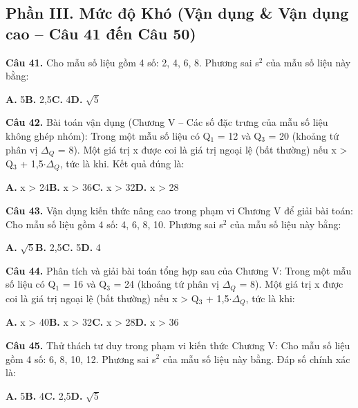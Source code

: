 \documentclass[11pt,a4paper]{article}
\begin{document}
\subsection*{\color{accent} Phần III. Mức độ Khó (Vận dụng \& Vận dụng cao -- Câu 41 đến Câu 50)}
\textbf{\color{primary} Câu 41.} Cho mẫu số liệu gồm 4 số: 2, 4, 6, 8. Phương sai s$^2$ của mẫu số liệu này bằng:\par
\hspace*{1.5em}\textbf{A.} 5\quad\quad \textbf{B.} 2,5\quad\quad \textbf{C.} 4\quad\quad \textbf{D.} $\sqrt{5}$\par\vspace{2pt}
\textbf{\color{primary} Câu 42.} Bài toán vận dụng (Chương V – Các số đặc trưng của mẫu số liệu không ghép nhóm): Trong một mẫu số liệu có Q$_1$ = 12 và Q$_3$ = 20 (khoảng tứ phân vị $\Delta_Q$ = 8). Một giá trị x được coi là giá trị ngoại lệ (bất thường) nếu x > Q$_3$ + 1,5$\cdot$$\Delta_Q$, tức là khi. Kết quả đúng là:\par
\hspace*{1.5em}\textbf{A.} x > 24\quad\quad \textbf{B.} x > 36\quad\quad \textbf{C.} x > 32\quad\quad \textbf{D.} x > 28\par\vspace{2pt}
\textbf{\color{primary} Câu 43.} Vận dụng kiến thức nâng cao trong phạm vi Chương V để giải bài toán: Cho mẫu số liệu gồm 4 số: 4, 6, 8, 10. Phương sai s$^2$ của mẫu số liệu này bằng:\par
\hspace*{1.5em}\textbf{A.} $\sqrt{5}$\quad\quad \textbf{B.} 2,5\quad\quad \textbf{C.} 5\quad\quad \textbf{D.} 4\par\vspace{2pt}
\textbf{\color{primary} Câu 44.} Phân tích và giải bài toán tổng hợp sau của Chương V: Trong một mẫu số liệu có Q$_1$ = 16 và Q$_3$ = 24 (khoảng tứ phân vị $\Delta_Q$ = 8). Một giá trị x được coi là giá trị ngoại lệ (bất thường) nếu x > Q$_3$ + 1,5$\cdot$$\Delta_Q$, tức là khi:\par
\hspace*{1.5em}\textbf{A.} x > 40\quad\quad \textbf{B.} x > 32\quad\quad \textbf{C.} x > 28\quad\quad \textbf{D.} x > 36\par\vspace{2pt}
\textbf{\color{primary} Câu 45.} Thử thách tư duy trong phạm vi kiến thức Chương V: Cho mẫu số liệu gồm 4 số: 6, 8, 10, 12. Phương sai s$^2$ của mẫu số liệu này bằng. Đáp số chính xác là:\par
\hspace*{1.5em}\textbf{A.} 5\quad\quad \textbf{B.} 4\quad\quad \textbf{C.} 2,5\quad\quad \textbf{D.} $\sqrt{5}$\par\vspace{2pt}
\end{document}
